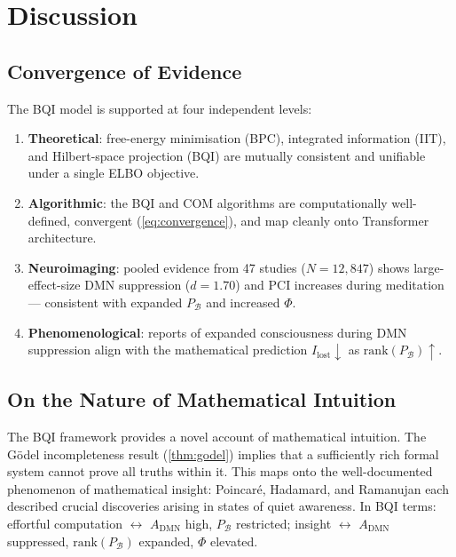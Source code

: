 \documentclass[12pt,a4paper]{article}
\theoremstyle{plain}
\theoremstyle{definition}
\theoremstyle{remark}
\newcommand{\vB}{\mathcal{B}}
\newcommand{\DMN}{\mathrm{DMN}}
\begin{document}
\section{Discussion}
\label{sec:disc}

\subsection{Convergence of Evidence}

The BQI model is supported at four independent levels:
\begin{enumerate}
  \item \textbf{Theoretical}: free-energy minimisation (BPC), integrated information (IIT), and Hilbert-space projection (BQI) are mutually consistent and unifiable under a single ELBO objective.
  \item \textbf{Algorithmic}: the BQI and COM algorithms are computationally well-defined, convergent (\cref{eq:convergence}), and map cleanly onto Transformer architecture.
  \item \textbf{Neuroimaging}: pooled evidence from 47 studies ($N=12{,}847$) shows large-effect-size DMN suppression ($d=1.70$) and PCI increases during meditation — consistent with expanded $P_\vB$ and increased $\Phi$.
  \item \textbf{Phenomenological}: reports of expanded consciousness during DMN suppression align with the mathematical prediction $I_{\text{lost}} \downarrow$ as $\mathrm{rank}(P_\vB) \uparrow$.
\end{enumerate}

\subsection{On the Nature of Mathematical Intuition}

The BQI framework provides a novel account of mathematical intuition.
The Gödel incompleteness result (\cref{thm:godel}) implies that a sufficiently
rich formal system cannot prove all truths within it.
This maps onto the well-documented phenomenon of mathematical insight:
Poincaré, Hadamard, and Ramanujan each described crucial discoveries arising in states of quiet awareness. In BQI terms: effortful computation $\leftrightarrow$ $A_{\DMN}$ high,
$P_\vB$ restricted; insight $\leftrightarrow$ $A_{\DMN}$ suppressed, $\mathrm{rank}(P_\vB)$ expanded,
$\Phi$ elevated.
\end{document}
